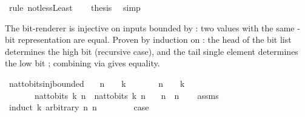 \begin{isabellebody}
\ {\isacharparenleft}{\kern0pt}rule\ not{\isacharunderscore}{\kern0pt}less{\isacharunderscore}{\kern0pt}Least{\isacharparenright}{\kern0pt}\isanewline
\ \ \isamarkupfalse%
\ {\isacharquery}{\kern0pt}thesis\ \isamarkupfalse%
\ simp\isanewline
{}\isamarkupfalse%
%
\endisatagproof
{\isafoldproof}%
%
\isadelimproof
%
\endisadelimproof
%
\begin{isamarkuptext}%
The bit-renderer is injective on inputs bounded by
  : two values with the same -bit
  representation are equal.  Proven by induction on :
  the head of the bit list determines the high bit 
  (recursive case), and the tail single element determines the
  low bit ; combining via
   gives equality.%
\end{isamarkuptext}\isamarkuptrue%
\isamarkupfalse%
\ nat{\isacharunderscore}{\kern0pt}to{\isacharunderscore}{\kern0pt}bits{\isacharunderscore}{\kern0pt}inj{\isacharunderscore}{\kern0pt}bounded{\isacharcolon}{\kern0pt}\isanewline
\ \ \ {\isachardoublequoteopen}n{}\ {\isacharless}{\kern0pt}\ {}\ {\isacharcircum}{\kern0pt}\ k{\isachardoublequoteclose}\isanewline
\ \ \ \ \ \ \ {\isachardoublequoteopen}n{}\ {\isacharless}{\kern0pt}\ {}\ {\isacharcircum}{\kern0pt}\ k{\isachardoublequoteclose}\isanewline
\ \ \ \ \ \ \ {\isachardoublequoteopen}nat{\isacharunderscore}{\kern0pt}to{\isacharunderscore}{\kern0pt}bits\ k\ n{}\ {\isacharequal}{\kern0pt}\ nat{\isacharunderscore}{\kern0pt}to{\isacharunderscore}{\kern0pt}bits\ k\ n{}{\isachardoublequoteclose}\isanewline
\ \ \ {\isachardoublequoteopen}n{}\ {\isacharequal}{\kern0pt}\ n{}{\isachardoublequoteclose}\isanewline
%
\isadelimproof
\ \ %
\endisadelimproof
%
\isatagproof
{}\isamarkupfalse%
\ assms\isanewline
{}\isamarkupfalse%
\ {\isacharparenleft}{\kern0pt}induct\ k\ arbitrary{\isacharcolon}{\kern0pt}\ n{}\ n{}{\isacharparenright}{\kern0pt}\isanewline
\ \ \isamarkupfalse%
\ {}\isanewline
\ \ \isamarkupfalse%
\ {\isacharquery}{\kern0pt}case\ \isamarkupfalse%

\end{isabellebody}
